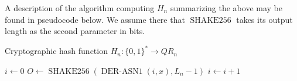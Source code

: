 \documentclass[a4paper,12pt]{article}
\DeclareMathOperator{\shake}{SHAKE256}
\DeclareMathOperator{\derasn}{DER-ASN1}
\begin{document}
A description of the algorithm computing $H_n$ summarizing the above may be found in pseudocode below. We assume there that $\shake$ takes its output length as the second parameter in bits.

\begin{algorithm}
  \caption{Cryptographic hash function $H_n : \{0,1\}^* \to QR_n$}
  \begin{algorithmic}
      \State $i \gets 0$
      \Repeat
        \State $O \gets \shake(\derasn(i, x), L_n-1)$
        \State $i \gets i + 1$
      \State {}
    \EndFunction
  \end{algorithmic}
\end{algorithm}
\end{document}
